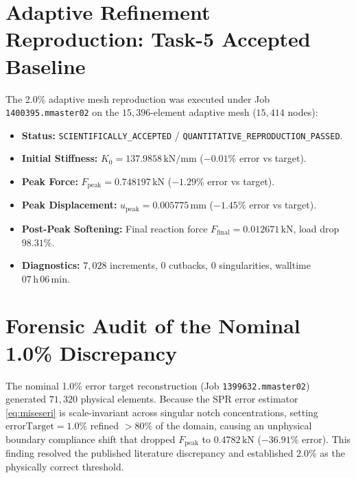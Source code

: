 \documentclass[11pt,a4paper]{report}
\begin{document}
\section{Adaptive Refinement Reproduction: Task-5 Accepted Baseline}
\label{sec:task5_repro}
The 2.0\% adaptive mesh reproduction was executed under Job \texttt{1400395.mmaster02} on the $15{,}396$-element adaptive mesh ($15{,}414$ nodes):
\begin{itemize}
    \item \textbf{Status:} \texttt{SCIENTIFICALLY\_ACCEPTED} / \texttt{QUANTITATIVE\_REPRODUCTION\_PASSED}.
    \item \textbf{Initial Stiffness:} $K_0 = 137.9858\,\mathrm{kN/mm}$ ($-0.01\%$ error vs target).
    \item \textbf{Peak Force:} $F_{\text{peak}} = 0.748197\,\mathrm{kN}$ ($-1.29\%$ error vs target).
    \item \textbf{Peak Displacement:} $u_{\text{peak}} = 0.005775\,\mathrm{mm}$ ($-1.45\%$ error vs target).
    \item \textbf{Post-Peak Softening:} Final reaction force $F_{\text{final}} = 0.012671\,\mathrm{kN}$, load drop $98.31\%$.
    \item \textbf{Diagnostics:} $7{,}028$ increments, $0$ cutbacks, $0$ singularities, walltime $07\,\mathrm{h}\,06\,\mathrm{min}$.
\end{itemize}

\section{Forensic Audit of the Nominal 1.0\% Discrepancy}
The nominal 1.0\% error target reconstruction (Job \texttt{1399632.mmaster02}) generated $71{,}320$ physical elements. Because the SPR error estimator \eqref{eq:miseseri} is scale-invariant across singular notch concentrations, setting $\text{errorTarget}=1.0\%$ refined $>80\%$ of the domain, causing an unphysical boundary compliance shift that dropped $F_{\text{peak}}$ to $0.4782\,\mathrm{kN}$ ($-36.91\%$ error). This finding resolved the published literature discrepancy and established $2.0\%$ as the physically correct threshold.
\end{document}
